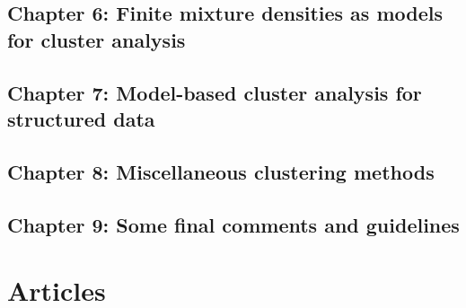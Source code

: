 \documentclass[a4paper,10pt]{article}
\begin{document}
\subsection{Chapter 6: Finite mixture densities as models for cluster analysis}

\subsection{Chapter 7: Model-based cluster analysis for structured data}

\subsection{Chapter 8: Miscellaneous clustering methods}

\subsection{Chapter 9: Some final comments and guidelines}

\newpage
\section{Articles}


\end{document}
